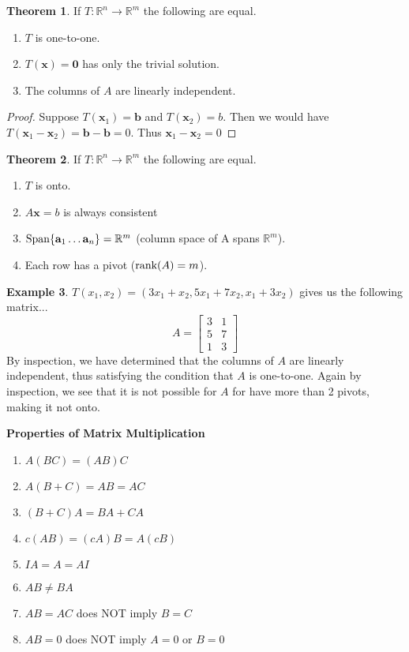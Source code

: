 \documentclass{article}
\numberwithin{equation}{section}
\theoremstyle{definition}
\newtheorem{thm}{Theorem}[subsection]
\newtheorem{ex}[thm]{Example}
\newcommand{\R}{\mathbb{R}}
\theoremstyle{adefn}
\begin{document}
	\begin{thm}
		If $T: \R^n \to \R^m$ the following are equal.
		\begin{enumerate}
			\itemsep0em
			\item $T$ is one-to-one.
			\item $T(\mathbf{x}) = \mathbf{0}$ has only the trivial solution. 
			\item The columns of $A$ are linearly independent. 
		\end{enumerate}
	\end{thm}
	\begin{proof}
		Suppose $T(\mathbf{x}_1) = \mathbf{b}$ and $T(\mathbf{x}_2) = b$. Then we would have $T(\mathbf{x}_1 - \mathbf{x}_2) = \mathbf{b} - \mathbf{b} = 0$. Thus $\mathbf{x}_1 - \mathbf{x}_2 = 0$
	\end{proof}
	\begin{thm}
		If $T: \R^n \to \R^m$ the following are equal.
		\begin{enumerate}
			\itemsep0em
			\item $T$ is onto. 
			\item $A\mathbf{x} = b$ is always consistent
			\item $\hbox{Span}\{ \mathbf{a}_1 \ldots \mathbf{a}_n \} = \R^m$ (column space of A spans $\R^m$).
			\item Each row has a pivot ($\hbox{rank}(A) = m$). 
		\end{enumerate}
	\end{thm}
	\begin{ex}
		$T(x_1, x_2) = (3x_1 + x_2, 5x_1 + 7x_2, x_1 + 3x_2)$ gives us the following matrix...
		$$A = \begin{bmatrix}
			3 & 1 \\ 5 & 7 \\ 1 & 3
		\end{bmatrix}$$
		By inspection, we have determined that the columns of $A$ are linearly independent, thus satisfying the condition that $A$ is one-to-one. Again by inspection, we see that it is not possible for $A$ for have more than 2 pivots, making it not onto. 
	\end{ex}
	\begin{framed}
		\textbf{Properties of Matrix Multiplication}
		\begin{enumerate}
				\item $A(BC) = (AB)C$ 
				\item $A(B+C) = AB = AC$
				\item $(B+C)A = BA + CA$
				\item $c(AB) = (cA)B = A(cB)$
				\item $IA = A = AI$
				\item $AB \neq BA$
				\item $AB = AC $ does NOT imply $B = C$
				\item $AB = 0 $ does NOT imply $A = 0$ or $B = 0$
		\end{enumerate}
	\end{framed}
\end{document}
